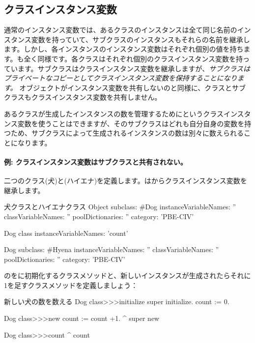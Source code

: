 \documentclass[a4paper,10pt,twoside]{book}
\begin{document}
\subsection{クラスインスタンス変数}
通常のインスタンス変数では、あるクラスのインスタンスは全て同じ名前のインスタンス変数を持っていて、サブクラスのインスタンスもそれらの名前を継承します。しかし、各インスタンスのインスタンス変数はそれぞれ個別の値を持ちます。も全く同様です。各クラスはそれぞれ個別のクラスインスタンス変数を持っています。サブクラスはクラスインスタンス変数を継承しますが、\emph{サブクラスはプライベートなコピーとしてクラスインスタンス変数を保持することになります。} オブジェクトがインスタンス変数を共有しないのと同様に、クラスとサブクラスもクラスインスタンス変数を共有しません。

あるクラスが生成したインスタンスの数を管理するためにというクラスインスタンス変数を使うことはできますが、そのサブクラスはどれも自分自身の変数を持つため、サブクラスによって生成されるインスタンスの数は別々に数えられることになります。

\paragraph{例: クラスインスタンス変数はサブクラスと共有されない。}
二つのクラス(犬)と(ハイエナ)を定義します。はからクラスインスタンス変数を継承します。

\begin{classdef}[dog]{犬クラスとハイエナクラス}
Object subclass: #Dog
	instanceVariableNames: ''
	classVariableNames: ''
	poolDictionaries: ''
	category: 'PBE-CIV'

Dog class
	instanceVariableNames: 'count'

Dog subclass: #Hyena
	instanceVariableNames: ''
	classVariableNames: ''
	poolDictionaries: ''
	category: 'PBE-CIV'
\end{classdef}

のをに初期化するクラスメソッドと、新しいインスタンスが生成されたらそれに1を足すクラスメソッドを定義しましょう：

\begin{method}[dogcount]{新しい犬の数を数える}
Dog class>>>initialize
	super initialize.
	count := 0.

Dog class>>>new
	count := count +1.
	^ super new

Dog class>>>count
	^ count
\end{method}
\end{document}
